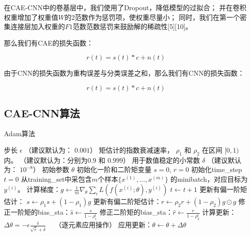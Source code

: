 在CAE-CNN中的卷基层中，我们使用了Dropout，降低模型的过拟合；
并在卷积权重增加了权重值$W$的2范数作为惩罚项，使权重尽量小；
同时，我们在第一个密集连接层加入权重的$F1$范数范数惩罚来鼓励解的稀疏性[5][10]。\par

那么我们有CAE的损失函数：\par
\begin{equation}\label{sec:eqt3_3}
r(t) = s(t)*c + n(t)
\end{equation}

由于CNN的损失函数为重构误差与分类误差之和，那么我们有CNN的损失函数：\par
\begin{equation}\label{sec:eqt3_4}
r(t) = s(t)*c + n(t)
\end{equation}


\subsection{CAE-CNN算法}

\begin{algorithm}[ht]
	\caption{Adam算法}
	\label{alg:adam}
	\begin{algorithmic}
		\REQUIRE 步长 $\epsilon$ （建议默认为： $0.001$）
		\REQUIRE 矩估计的指数衰减速率， $\rho_1$ 和 $\rho_2$ 在区间 $[0, 1)$内。
		（建议默认为：分别为$0.9$ 和 $0.999$）
		\REQUIRE 用于数值稳定的小常数 $\delta$  （建议默认为： $10^{-8}$）
		\REQUIRE 初始参数 $\theta$
		\STATE 初始化一阶和二阶矩变量 $s = 0 $, $r = 0$
		\STATE 初始化\gls{time_step} $t=0$ 
		\STATE 从\gls{training_set}中采包含$m$个样本$\{ x^{(1)},\dots, x^{(m)}\}$ 的\gls{minibatch}，对应目标为$y^{(i)}$。
		\STATE 计算梯度：$g \leftarrow \frac{1}{m} \nabla_{\theta} \sum_i L(f(x^{(i)};\theta),y^{(i)})$ 
		\STATE $t \leftarrow t + 1$
		\STATE 更新有偏一阶矩估计： $s \leftarrow \rho_1 s + (1-\rho_1) g$
		\STATE 更新有偏二阶矩估计：$r \leftarrow \rho_2 r + (1-\rho_2)  g \odot g$
		\STATE 修正一阶矩的\gls{bias_sta}：$\hat{s} \leftarrow \frac{s}{1-\rho_1^t}$
		\STATE 修正二阶矩的\gls{bias_sta}：$\hat{r} \leftarrow \frac{r}{1-\rho_2^t}$
		\STATE 计算更新：$\Delta \theta = - \epsilon \frac{\hat{s}}{\sqrt{\hat{r}} + \delta}$ \ \  （逐元素应用操作）
		\STATE 应用更新：$\theta \leftarrow \theta + \Delta \theta$
		\ENDWHILE
	\end{algorithmic}
\end{algorithm}


